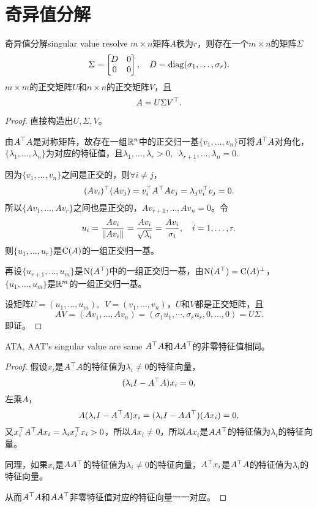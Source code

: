 \section{奇异值分解}
\begin{theorem}{奇异值分解}{singular value resolve}
	$m\times n$矩阵$A$秩为$r$，则存在一个$m\times n$的矩阵$\Sigma$ 
	\[
		\Sigma=\begin{bmatrix}
			D&0\\0&0
		\end{bmatrix},\quad D=\operatorname{diag}(\sigma_1,\ldots,\sigma_r).
	\]
	$m\times m$的正交矩阵$U$和$n\times n$的正交矩阵$V$，且 
	\[
		A=U\Sigma V^\top.
	\]
\end{theorem}
\begin{proof}
	直接构造出$U,\Sigma,V$。
	
	由$A^\top A$是对称矩阵，故存在一组$\mathbb R^n$中的正交归一基$\{v_1,\ldots,v_n\}$可将$A^\top A$对角化，$\{\lambda_1,\ldots,\lambda_n\}$为对应的特征值，且$\lambda_1,\ldots,\lambda_r>0,\enspace\lambda_{r+1},\ldots,\lambda_n=0.$
	
	因为$\{v_1,\ldots,v_n\}$之间是正交的，则$\forall i\neq j$，
	\[
		(Av_i)^\top(Av_j)=v_i^\top A^\top Av_j=\lambda_jv_i^\top v_j=0.
	\]
	所以$\{Av_1,\ldots,Av_r\}$之间也是正交的，$Av_{r+1},\ldots,Av_n=0$。令
	\[
		u_i=\frac{Av_i}{\left\lVert Av_i\right\rVert}=\frac{Av_i}{\sqrt{\lambda_i}}=\frac{Av_i}{\sigma_i},\quad i=1,\ldots,r.
	\]
	则$\{u_1,\ldots,u_r\}$是$\operatorname{C}(A)$的一组正交归一基。
	
	再设$\{u_{r+1},\ldots,u_m\}$是$\operatorname{N}(A^\top)$中的一组正交归一基，由$\operatorname{N}(A^\top)=\operatorname{C}(A)^\perp$，$\{u_1,\ldots,u_m\}$是$\mathbb R^m$的一组正交归一基。
	
	设矩阵$U=(u_1,\ldots,u_m),\enspace V=(v_1,\ldots,v_n)$，$U$和$V$都是正交矩阵，且
	\[
		AV=(Av_1,\ldots,Av_n)=(\sigma_1u_1,\cdots,\sigma_ru_r,0,\ldots,0)=U\Sigma.
	\]
	即证。
\end{proof}
\begin{theorem}{}{ATA, AAT's singular value are same}
	$A^\top A$和$AA^\top$的非零特征值相同。
\end{theorem}
\begin{proof}
	假设$x_i$是$A^\top A$的特征值为$\lambda_i\neq 0$的特征向量，
	\[
		(\lambda_iI-A^\top A)x_i=0,
	\]
	左乘$A$，
	\[
		A(\lambda_iI-A^\top A)x_i=(\lambda_iI-AA^\top)(Ax_i)=0,
	\]
	又$x_i^\top A^\top Ax_i=\lambda_i x_i^\top x_i>0$，所以$Ax_i\neq 0$，所以$Ax_i$是$AA^\top$的特征值为$\lambda_i$的特征向量。
	
	同理，如果$x_i$是$AA^\top$的特征值为$\lambda_i\neq 0$的特征向量，$A^\top x_i$是$A^\top A$的特征值为$\lambda_i$的特征向量。
	
	从而$A^\top A$和$AA^\top$非零特征值对应的特征向量一一对应。
\end{proof}
